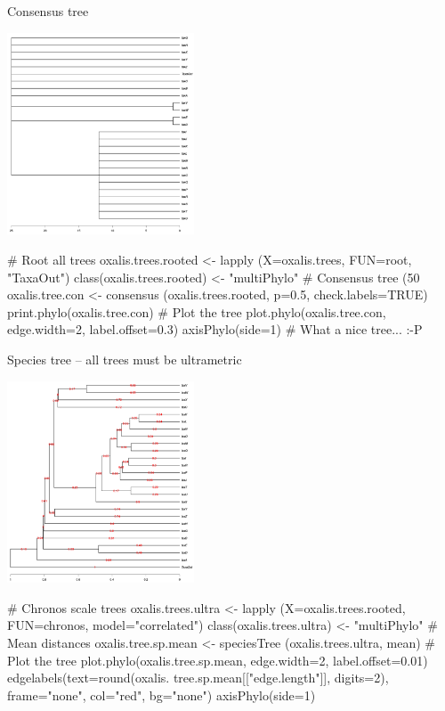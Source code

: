 \documentclass[compress, ucs, xelatex, 11pt, xcolor=svgnames,
  hyperref={
    bookmarks=true,
    unicode=true,
    colorlinks=true,
    pdftitle={Molecular data in R},
    plainpages=false,
    pdfauthor={Vojtech Zeisek},
    pdfsubject={Course about phylogeny and evolution in R},
    pdfcreator={XeLaTeX},
    pdfkeywords={R, evolution, phylogeny, molecular data},
    linkcolor=Tomato,
    anchorcolor=SaddleBrown,
    citecolor=Goldenrod,
    filecolor=DarkMagenta,
    menucolor=Sienna,
    urlcolor=DarkTurquoise,
    pdftex},
  url={hyphens, lowtilde} %
  ]{beamer}
\begin{document}
\begin{frame}[fragile]{Consensus tree}
\begin{multicols}{2}
  \includegraphics[height=6cm]{oxalis-cons.png}
  \begin{spluscode}
    # Root all trees
    oxalis.trees.rooted <- lapply
      (X=oxalis.trees, FUN=root,
      "TaxaOut")
    class(oxalis.trees.rooted) <-
      "multiPhylo"
    # Consensus tree (50 %
    oxalis.tree.con <- consensus
      (oxalis.trees.rooted, p=0.5,
      check.labels=TRUE)
    print.phylo(oxalis.tree.con)
    # Plot the tree
    plot.phylo(oxalis.tree.con,
      edge.width=2, label.offset=0.3)
    axisPhylo(side=1)
    # What a nice tree... :-P
  \end{spluscode}
\end{multicols}
\end{frame}

\begin{frame}[fragile]{Species tree -- all trees must be ultrametric}
\begin{multicols}{2}
\includegraphics[height=6cm]{oxalis-sp.png}
  \columnbreak
  \begin{spluscode}
    # Chronos scale trees
    oxalis.trees.ultra <- lapply
      (X=oxalis.trees.rooted,
      FUN=chronos, model="correlated")
    class(oxalis.trees.ultra) <-
      "multiPhylo"
    # Mean distances
    oxalis.tree.sp.mean <- speciesTree
      (oxalis.trees.ultra, mean)
    # Plot the tree
    plot.phylo(oxalis.tree.sp.mean,
      edge.width=2, label.offset=0.01)
    edgelabels(text=round(oxalis.
      tree.sp.mean[["edge.length"]],
      digits=2), frame="none",
      col="red", bg="none")
    axisPhylo(side=1)
  \end{spluscode}
\end{multicols}
\end{frame}
\end{document}
